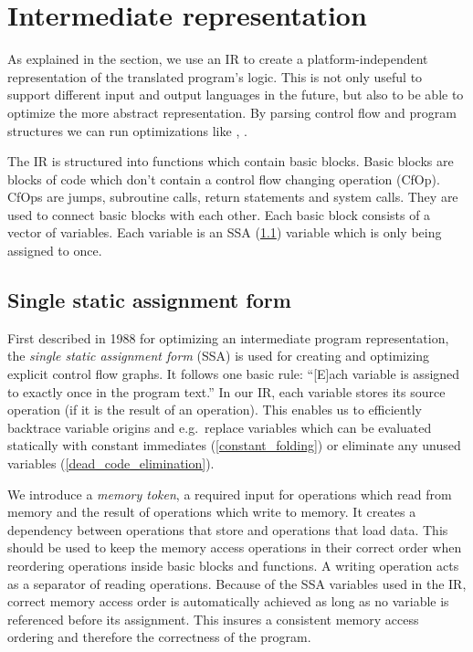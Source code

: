 \documentclass[course=eragp]{aspdoc}
\begin{document}
\section{Intermediate representation}\label{IR}

As explained in the  section, we use an IR to create a platform-independent
representation of the translated program's logic. This is not only useful to support different input
and output languages in the future, but also to be able to optimize the more abstract representation.
By parsing control flow and program structures we can run optimizations like
, .

The IR is structured into functions which contain basic blocks. Basic blocks are blocks of code
which don't contain a control flow changing operation (CfOp). CfOps are jumps, subroutine calls,
return statements and system calls. They are used to connect basic blocks with each other. Each
basic block consists of a vector of variables. Each variable is an SSA (\ref{ssa}) variable which is
only being assigned to once.

\subsection{Single static assignment form}\label{ssa}

First described in 1988 for optimizing an intermediate program representation\cite{ssa_proposal},
the \emph{single static assignment form} (SSA) is used for creating and optimizing explicit control
flow graphs. It follows one basic rule: ``[E]ach variable is
assigned to exactly once in the program text.''\cite[p.~18]{ssa_proposal} In our IR, each variable
stores its source operation (if it is the result of an operation). This enables us to efficiently
backtrace variable origins and e.g.\ replace variables which can be evaluated statically with constant
immediates (\ref{constant_folding}) or eliminate any unused variables (\ref{dead_code_elimination}).

We introduce a \emph{memory token}, a required input for operations which read from memory and the
result of operations which write to memory. It creates a dependency between operations that store
and operations that load data. This should be used to keep the memory access operations
in their correct order when reordering operations inside basic blocks and functions. A writing
operation acts as a separator of reading operations. Because of the SSA variables used in the IR,
correct memory access order is automatically achieved as long as no variable is referenced before
its assignment. This insures a consistent memory access ordering and therefore the correctness of the
program.
\end{document}
